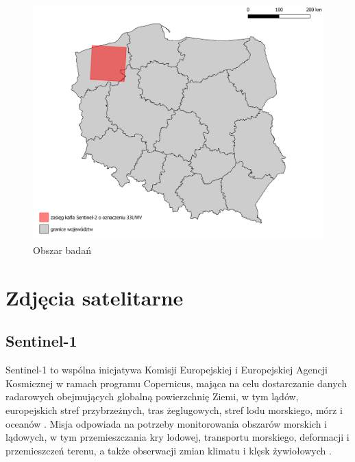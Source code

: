 \documentclass{amuthesis}
\begin{document}
\begin{figure}[t]

{\centering \includegraphics[width=1\textwidth,height=\textheight]{figures/sen2_extent.png}

}

\caption{\label{fig-rycina-area}Obszar badań}

\end{figure}

\hypertarget{sec-satellite-imagery}{%
\section{Zdjęcia satelitarne}\label{sec-satellite-imagery}}

\hypertarget{sec-sentinel1}{%
\subsection{Sentinel-1}\label{sec-sentinel1}}

Sentinel-1 to wspólna inicjatywa Komisji Europejskiej i Europejskiej
Agencji Kosmicznej w ramach programu Copernicus, mająca na celu
dostarczanie danych radarowych obejmujących globalną powierzchnię Ziemi,
w tym lądów, europejskich stref przybrzeżnych, tras żeglugowych, stref
lodu morskiego, mórz i oceanów
\autocite{hejmanowska_2020_dane,sentinel1_mission_objectives}. Misja
odpowiada na potrzeby monitorowania obszarów morskich i lądowych, w tym
przemieszczania kry lodowej, transportu morskiego, deformacji i
przemieszczeń terenu, a także obserwacji zmian klimatu i klęsk
żywiołowych
\autocite{hejmanowska_2020_dane,sentinel1_mission_objectives}.
\end{document}
